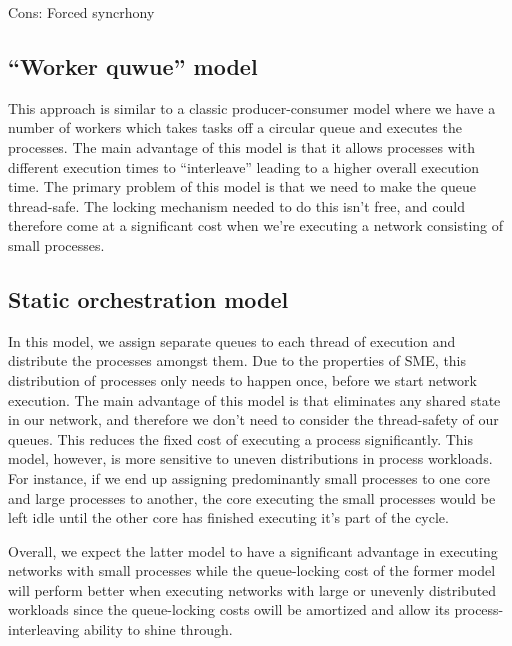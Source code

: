 Cons: Forced syncrhony 

\subsection{``Worker quwue'' model}
This approach is similar to a classic producer-consumer model where we
have a number of workers which takes tasks off a circular queue and
executes the processes. The main advantage of this model is that it
allows processes with different execution times to ``interleave''
leading to a higher overall execution time. The primary problem of
this model is that we need to make the queue thread-safe. The locking
mechanism needed to do this isn't free, and could therefore come at a
significant cost when we're executing a network consisting of small
processes.

\subsection{Static orchestration model}
In this model, we assign separate queues to each thread of execution
and distribute the processes amongst them. Due to the properties of
SME, this distribution of processes only needs to happen once, before
we start network execution. The main advantage of this model is that
eliminates any shared state in our network, and therefore we don't
need to consider the thread-safety of our queues. This reduces the
fixed cost of executing a process significantly. This model, however,
is more sensitive to uneven distributions in process workloads. For
instance, if we end up assigning predominantly small processes to one
core and large processes to another, the core executing the small
processes would be left idle until the other core has finished
executing it's part of the cycle.


Overall, we expect the latter model to have a significant advantage in
executing networks with small processes while the queue-locking cost
of the former model will perform better when executing networks with
large or unevenly distributed workloads since the queue-locking costs
owill be amortized and allow its process-interleaving ability to shine
through.


